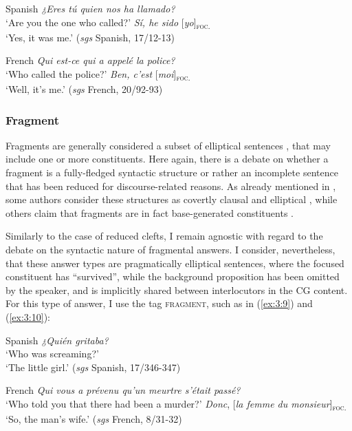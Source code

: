 \newpage
\ea  \label{ex:3:7}  Spanish
\ea \textit{¿Eres tú quien nos ha llamado?} \\
 ‘Are you the one who called?'
\ex  \textit{Sí, he sido}  [\textit{yo}]\textsubscript{\textsc{foc.}} \\
\normalsize‘Yes, it was me.' \hfill (\textit{sgs} Spanish, 17/12-13)   
\z \z
 
 \ea \label{ex:3:8} French
\ea  \textit{Qui est-ce qui a appelé la police? }\\
 ‘Who called the police?'
\ex \textit{ Ben, c'est} {[\textit{moi}]\textsubscript{\textsc{foc.}}}\normalsize \\
‘Well, it's me.' \hfill (\textit{sgs} French, 20/92-93)  
\z \z 

\subsubsection{Fragment}
Fragments are generally considered a subset of elliptical sentences \parencite{merchant2005fragments}, that may include one or more constituents. Here again, there is a debate on whether a fragment is a fully-fledged syntactic structure or rather an incomplete sentence that has been reduced for discourse-related reasons. As already mentioned in ,
some authors consider these structures as covertly clausal and elliptical \parencite{merchant2005fragments}, while others claim that fragments are in fact base-generated constituents \parencite{stainton1998quantifier, jonathan2000interrogative, jacobson2016short}. 

Similarly to the case of reduced clefts, I remain agnostic with regard to the debate on the syntactic nature of fragmental answers. I consider, nevertheless, that these answer types are pragmatically elliptical sentences, where the focused constituent has ``survived”, while the background proposition has been omitted by the speaker, and is implicitly shared between interlocutors in the CG content. For this type of answer, I use the tag \textsc{fragment}, such as in (\ref{ex:3:9}) and (\ref{ex:3:10}):

\ea \label{ex:3:9} Spanish
\ea \textit{¿Quién gritaba?} \\
 ‘Who was screaming?'
\normalsize \\
‘The little girl.' \hfill (\textit{sgs} Spanish, 17/346-347)   
\z \z

 \ea \label{ex:3:10} French
\ea 	\textit{Qui vous a prévenu qu'un meurtre s'était passé?} \\
 ‘Who told you that there had been a murder?'
\ex   \textit{Donc}, {[\textit{la femme du monsieur}]\textsubscript{\textsc{foc.}}}\normalsize \\
‘So, the man's wife.' \hfill (\textit{sgs} French, 8/31-32)   
\z \z 

